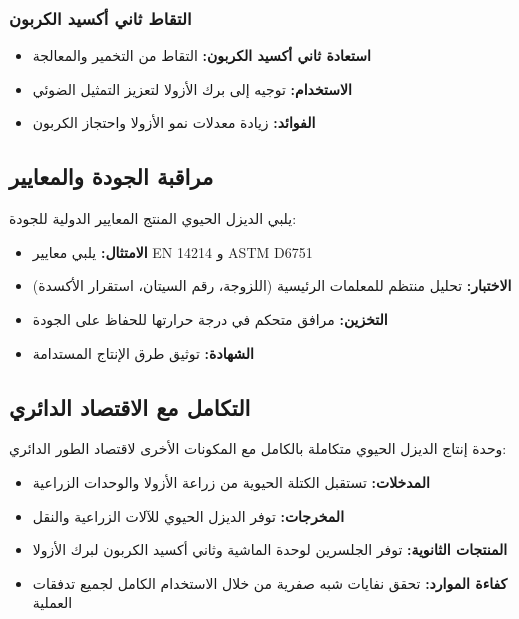 \subsubsection{التقاط ثاني أكسيد الكربون}
\begin{itemize}
    \item \textbf{استعادة ثاني أكسيد الكربون:} التقاط من التخمير والمعالجة
    \item \textbf{الاستخدام:} توجيه إلى برك الأزولا لتعزيز التمثيل الضوئي
    \item \textbf{الفوائد:} زيادة معدلات نمو الأزولا واحتجاز الكربون
\end{itemize}

\subsection{مراقبة الجودة والمعايير}

يلبي الديزل الحيوي المنتج المعايير الدولية للجودة:

\begin{itemize}
    \item \textbf{الامتثال:} يلبي معايير EN 14214 و ASTM D6751
    \item \textbf{الاختبار:} تحليل منتظم للمعلمات الرئيسية (اللزوجة، رقم السيتان، استقرار الأكسدة)
    \item \textbf{التخزين:} مرافق متحكم في درجة حرارتها للحفاظ على الجودة
    \item \textbf{الشهادة:} توثيق طرق الإنتاج المستدامة
\end{itemize}

\subsection{التكامل مع الاقتصاد الدائري}

وحدة إنتاج الديزل الحيوي متكاملة بالكامل مع المكونات الأخرى لاقتصاد الطور الدائري:

\begin{itemize}
    \item \textbf{المدخلات:} تستقبل الكتلة الحيوية من زراعة الأزولا والوحدات الزراعية
    \item \textbf{المخرجات:} توفر الديزل الحيوي للآلات الزراعية والنقل
    \item \textbf{المنتجات الثانوية:} توفر الجلسرين لوحدة الماشية وثاني أكسيد الكربون لبرك الأزولا
    \item \textbf{كفاءة الموارد:} تحقق نفايات شبه صفرية من خلال الاستخدام الكامل لجميع تدفقات العملية
\end{itemize}

